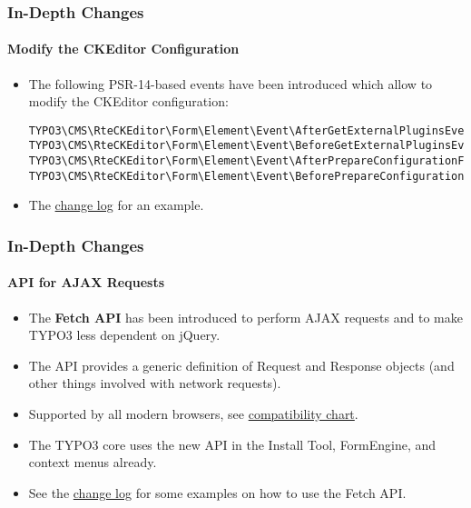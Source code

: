
\begin{frame}[fragile]
	\frametitle{In-Depth Changes}
	\framesubtitle{Modify the CKEditor Configuration}

	\lstset{basicstyle=\tiny\ttfamily}

	\begin{itemize}
		\item The following PSR-14-based events have been introduced which allow to modify the CKEditor configuration:
\begin{lstlisting}
TYPO3\CMS\RteCKEditor\Form\Element\Event\AfterGetExternalPluginsEvent
TYPO3\CMS\RteCKEditor\Form\Element\Event\BeforeGetExternalPluginsEvent
TYPO3\CMS\RteCKEditor\Form\Element\Event\AfterPrepareConfigurationForEditorEvent
TYPO3\CMS\RteCKEditor\Form\Element\Event\BeforePrepareConfigurationForEditorEvent
\end{lstlisting}

		\item The
			\href{https://docs.typo3.org/c/typo3/cms-core/master/en-us/Changelog/10.3/Feature-88818-IntroduceEventsToModifyCKEditorConfiguration.html}{change log}
			for an example.
	\end{itemize}

\end{frame}


\begin{frame}[fragile]
	\frametitle{In-Depth Changes}
	\framesubtitle{API for AJAX Requests}

	\lstset{basicstyle=\tiny\ttfamily}

	\begin{itemize}
		\item The \textbf{Fetch API} has been introduced to perform AJAX requests
			and to make TYPO3 less dependent on jQuery.
		\item The API provides a generic definition of Request and Response objects
			(and other things involved with network requests).
		\item Supported by all modern browsers, see
			\href{https://developer.mozilla.org/en-US/docs/Web/API/Fetch_API}{compatibility chart}.
		\item The TYPO3 core uses the new API in the Install Tool, FormEngine, and
			context menus already.
		\item See the
			\href{https://docs.typo3.org/c/typo3/cms-core/master/en-us/Changelog/10.3/Feature-89738-ApiForAjaxRequests.html}{change log}
			for some examples on how to use the Fetch API.

	\end{itemize}

\end{frame}

